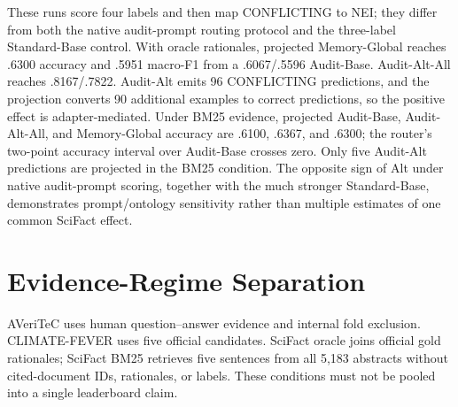 \documentclass[runningheads]{llncs}
\begin{document}
These runs score four labels and then map CONFLICTING to NEI; they differ from
both the native audit-prompt routing protocol and the three-label
Standard-Base control. With oracle rationales, projected
Memory-Global reaches .6300 accuracy and .5951 macro-F1 from a .6067/.5596
Audit-Base. Audit-Alt-All reaches .8167/.7822. Audit-Alt emits 96 CONFLICTING predictions, and
the projection converts 90 additional examples to correct predictions, so the
positive effect is adapter-mediated. Under BM25 evidence, projected Audit-Base,
Audit-Alt-All, and Memory-Global accuracy are .6100, .6367, and .6300; the router's
two-point accuracy interval over Audit-Base crosses zero. Only five Audit-Alt predictions
are projected in the BM25 condition. The opposite sign of Alt under native
audit-prompt scoring, together with the much stronger Standard-Base,
demonstrates prompt/ontology sensitivity rather than multiple estimates of
one common SciFact effect.

\section{Evidence-Regime Separation}
AVeriTeC uses human question--answer evidence and internal fold exclusion.
CLIMATE-FEVER uses five official candidates. SciFact oracle joins official
gold rationales; SciFact BM25 retrieves five sentences from all 5,183
abstracts without cited-document IDs, rationales, or labels. These conditions
must not be pooled into a single leaderboard claim.



\end{document}
